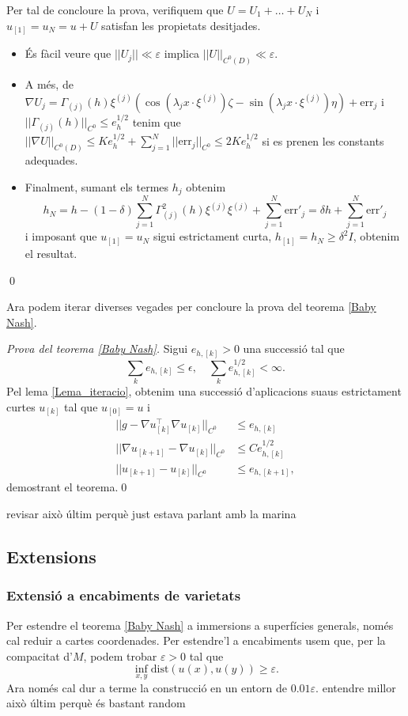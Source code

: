 Per tal de concloure la prova, verifiquem que $U=U_1+\dots+U_N$ i $u_{[1]}=u_N=u+U$ satisfan les propietats desitjades.

\begin{itemize}
    \item És fàcil veure que $||U_j|| \ll \varepsilon$ implica $||U||_{C^0(D)} \ll \varepsilon$.
    \item A més, de $\nabla U_j = \Gamma_{(j)}(h)\xi^{(j)}(\cos(\lambda_j x\cdot\xi^{(j)})\zeta - \sin(\lambda_j x\cdot\xi^{(j)})\eta) + \text{err}_j$ i $||\Gamma_{(j)}(h)||_{C^0} \le e_h^{1/2}$ tenim que $||\nabla U||_{C^0(D)} \le Ke_h^{1/2} + \sum_{j=1}^N ||\text{err}_j||_{C^0} \le 2Ke_h^{1/2}$ si es prenen les constants adequades. 
    \item Finalment, sumant els termes $h_j$ obtenim 
    \begin{equation*}
        h_N = h-(1-\delta)\sum_{j=1}^N \Gamma^2_{(j)}(h)\xi^{(j)}\xi^{(j)} + \sum_{j=1}^N \text{err}'_j = \delta h + \sum_{j=1}^N \text{err}'_j
    \end{equation*}
    i imposant que $u_{[1]} = u_N$ sigui estrictament curta, $h_{[1]}=h_N \ge \delta^2 I$, obtenim el resultat.
\end{itemize}
\qed

Ara podem iterar diverses vegades per concloure la prova del teorema \ref{Baby Nash}.

\textit{Prova del teorema \ref{Baby Nash}.} Sigui $e_{h,[k]}>0$ una successió tal que
$$\sum_{k}e_{h,[k]}\le \epsilon,\quad\sum_{k}e_{h,[k]}^{1/2}<\infty.$$ 
Pel lema \ref{Lema_iteracio}, obtenim una successió d'aplicacions suaus estrictament curtes $u_{[k]}$ tal que $u_{[0]}=u$ i
\begin{equation*}
    \begin{aligned}
    ||g-\nabla u_{[k]}^\intercal\nabla u_{[k]}||_{C^0} &\le e_{h,[k]}\\
    ||\nabla u_{[k+1]}-\nabla u_{[k]}||_{C^0} &\le Ce^{1/2}_{h,[k]}\\
    ||u_{[k+1]}-u_{[k]}||_{C^0} &\le e_{h,[k+1]},
    \end{aligned}
\end{equation*}
demostrant el teorema.\qed

{\color{blue} revisar això últim perquè just estava parlant amb la marina}
\subsection{Extensions}
\subsubsection{Extensió a encabiments de varietats}
Per estendre el teorema \ref{Baby Nash} a immersions a superfícies generals, només cal reduir a cartes coordenades. Per estendre'l a encabiments usem que, per la compacitat d'$M$, podem trobar $\varepsilon>0$ tal que 
$$\inf_{x,y} \text{dist}(u(x), u(y))\ge\varepsilon.$$ Ara només cal dur a terme la construcció en un entorn de $0.01\varepsilon$.{\color{blue} entendre millor això últim perquè és bastant random}
